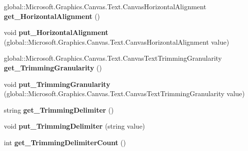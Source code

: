 \begin{DoxyCompactItemize}
global\+::\+Microsoft.\+Graphics.\+Canvas.\+Text.\+Canvas\+Horizontal\+Alignment {\bfseries get\+\_\+\+Horizontal\+Alignment} ()
\item 
\mbox{\label{interface_microsoft_1_1_graphics_1_1_canvas_1_1_text_1_1_i_canvas_text_format_aa35da0e8e55810f44b20d72a857dc479}} 
void {\bfseries put\+\_\+\+Horizontal\+Alignment} (global\+::\+Microsoft.\+Graphics.\+Canvas.\+Text.\+Canvas\+Horizontal\+Alignment value)
\item 
\mbox{\label{interface_microsoft_1_1_graphics_1_1_canvas_1_1_text_1_1_i_canvas_text_format_a2db054de408def815030a08cc7d260fb}} 
global\+::\+Microsoft.\+Graphics.\+Canvas.\+Text.\+Canvas\+Text\+Trimming\+Granularity {\bfseries get\+\_\+\+Trimming\+Granularity} ()
\item 
\mbox{\label{interface_microsoft_1_1_graphics_1_1_canvas_1_1_text_1_1_i_canvas_text_format_a8024f0e16f1e45d41135c2f6848b2dca}} 
void {\bfseries put\+\_\+\+Trimming\+Granularity} (global\+::\+Microsoft.\+Graphics.\+Canvas.\+Text.\+Canvas\+Text\+Trimming\+Granularity value)
\item 
\mbox{\label{interface_microsoft_1_1_graphics_1_1_canvas_1_1_text_1_1_i_canvas_text_format_a465c8b167bfb7c8dd79219d09f74a2ab}} 
string {\bfseries get\+\_\+\+Trimming\+Delimiter} ()
\item 
\mbox{\label{interface_microsoft_1_1_graphics_1_1_canvas_1_1_text_1_1_i_canvas_text_format_ad1fbe65d5abfd8c79af18f07b497a1fd}} 
void {\bfseries put\+\_\+\+Trimming\+Delimiter} (string value)
\item 
\mbox{\label{interface_microsoft_1_1_graphics_1_1_canvas_1_1_text_1_1_i_canvas_text_format_aa876e799c133cf8e68453bded95d54a5}} 
int {\bfseries get\+\_\+\+Trimming\+Delimiter\+Count} ()
\item 
\mbox{\label{interface_microsoft_1_1_graphics_1_1_canvas_1_1_text_1_1_i_canvas_text_format_af82b609763bb9627688ef6dadfc58009}} 

\end{DoxyCompactItemize}
